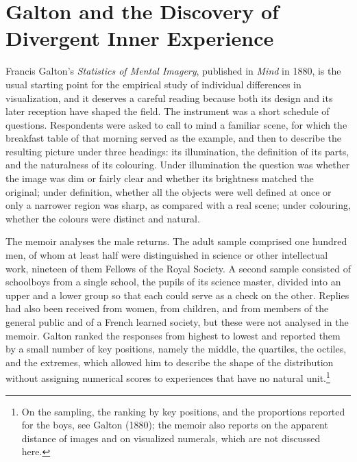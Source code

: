 \documentclass[11pt]{article}
\theoremstyle{remark}
\begin{document}
\section{Galton and the Discovery of Divergent Inner Experience}

Francis Galton's \emph{Statistics of Mental Imagery}, published in \emph{Mind} in 1880, is the usual starting point for the empirical study of individual differences in visualization, and it deserves a careful reading because both its design and its later reception have shaped the field. The instrument was a short schedule of questions. Respondents were asked to call to mind a familiar scene, for which the breakfast table of that morning served as the example, and then to describe the resulting picture under three headings: its illumination, the definition of its parts, and the naturalness of its colouring. Under illumination the question was whether the image was dim or fairly clear and whether its brightness matched the original; under definition, whether all the objects were well defined at once or only a narrower region was sharp, as compared with a real scene; under colouring, whether the colours were distinct and natural.

The memoir analyses the male returns. The adult sample comprised one hundred men, of whom at least half were distinguished in science or other intellectual work, nineteen of them Fellows of the Royal Society. A second sample consisted of schoolboys from a single school, the pupils of its science master, divided into an upper and a lower group so that each could serve as a check on the other. Replies had also been received from women, from children, and from members of the general public and of a French learned society, but these were not analysed in the memoir. Galton ranked the responses from highest to lowest and reported them by a small number of key positions, namely the middle, the quartiles, the octiles, and the extremes, which allowed him to describe the shape of the distribution without assigning numerical scores to experiences that have no natural unit.\footnote{On the sampling, the ranking by key positions, and the proportions reported for the boys, see Galton (1880); the memoir also reports on the apparent distance of images and on visualized numerals, which are not discussed here.}
\end{document}

